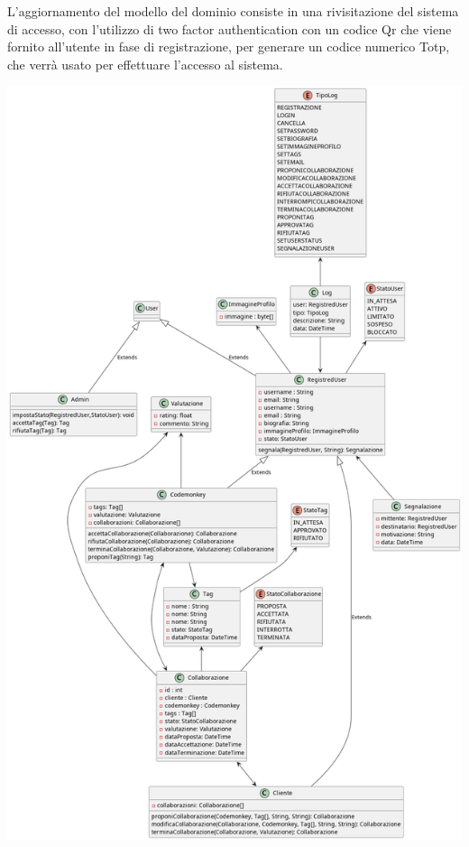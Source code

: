 L'aggiornamento del modello del dominio consiste in una rivisitazione del sistema di accesso, con l'utilizzo di two factor authentication con un codice Qr che viene fornito all'utente in fase di registrazione, per generare un codice numerico Totp, che verrà usato per effettuare l'accesso al sistema.
\linebreak

\includegraphics[width=1\textwidth]{assets/plantuml/modello_di_dettaglio_del_dominio.png}\\